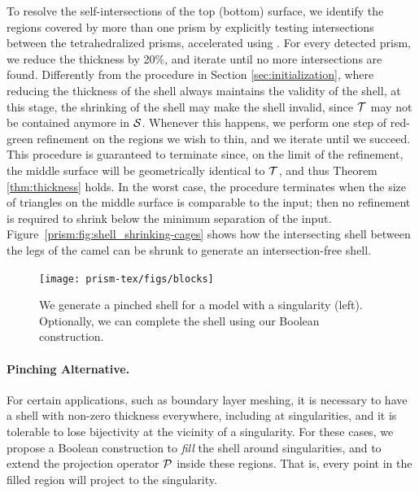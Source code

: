To resolve the self-intersections of the top (bottom) surface, we identify the regions covered by more than one prism by explicitly testing intersections between the tetrahedralized prisms, accelerated using \cite{zomorodian2000fast}. For every detected prism, we reduce the thickness by 20\%, and iterate until no more intersections are found. 
Differently from the procedure in Section \ref{sec:initialization}, where reducing the thickness of the shell always maintains the validity of the shell, at this stage, the shrinking of the shell may make the shell invalid, since $\T$ may not be contained anymore in $\S$. 
Whenever this happens, we perform one step of red-green refinement \cite{bank1983some} on the regions we wish to thin, and we iterate until we succeed. This procedure is guaranteed to terminate since, on the limit of the refinement, the middle surface will be geometrically identical to $\T$, and thus Theorem \ref{thm:thickness} holds.
In the worst case, the procedure terminates when the size of triangles on the middle surface is comparable to the input; then no refinement is required to shrink below the minimum separation of the input.
Figure~\ref{prism:fig:shell_shrinking-cages} shows how the intersecting shell between the legs of the camel can be shrunk to generate an intersection-free shell. 



\begin{figure}
    \centering
    \texttt{[image: prism-tex/figs/blocks]}
    \caption{We generate a pinched shell for a model with a singularity (left).
    Optionally, we can complete the shell using our Boolean construction.}
    \label{prism:fig:singularity-boolean}
    
\end{figure}


\paragraph{Pinching Alternative.} For certain applications, such as boundary layer meshing, it is necessary to have a shell with non-zero thickness everywhere, including at singularities, and it is tolerable to lose bijectivity at the vicinity of a singularity. For these cases, we propose a Boolean construction to \emph{fill} the shell around singularities, and to extend the projection operator $\P$ inside these regions. That is, every point in the filled region will project to the singularity. 

